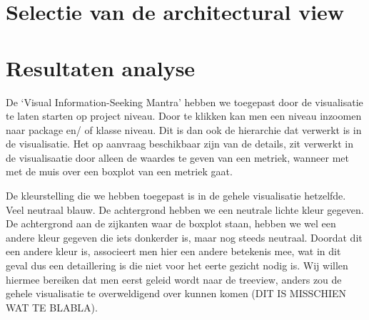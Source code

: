 \documentclass[a4paper]{article}
\begin{document}
\section{Selectie van de architectural view}


\section{Resultaten analyse}
De `Visual Information-Seeking Mantra' hebben we toegepast door de visualisatie te laten starten op project niveau. Door te klikken kan men een niveau inzoomen naar package en/ of klasse niveau. Dit is dan ook de hierarchie dat verwerkt is in de visualisatie. Het op aanvraag beschikbaar zijn van de details, zit verwerkt in de visualisaatie door alleen de waardes te geven van een metriek, wanneer met met de muis over een boxplot van een metriek gaat.

De kleurstelling die we hebben toegepast is in de gehele visualisatie hetzelfde. Veel neutraal blauw. De achtergrond hebben we een neutrale lichte kleur gegeven. De achtergrond aan de zijkanten waar de boxplot staan, hebben we wel een andere kleur gegeven die iets donkerder is, maar nog steeds neutraal. Doordat dit een andere kleur is, associeert men hier een andere betekenis mee, wat in dit geval dus een detaillering is die niet voor het eerte gezicht nodig is. Wij willen hiermee bereiken dat men eerst geleid wordt naar de treeview, anders zou de gehele visualisatie te overweldigend over kunnen komen (DIT IS MISSCHIEN WAT TE BLABLA).




\end{document}
